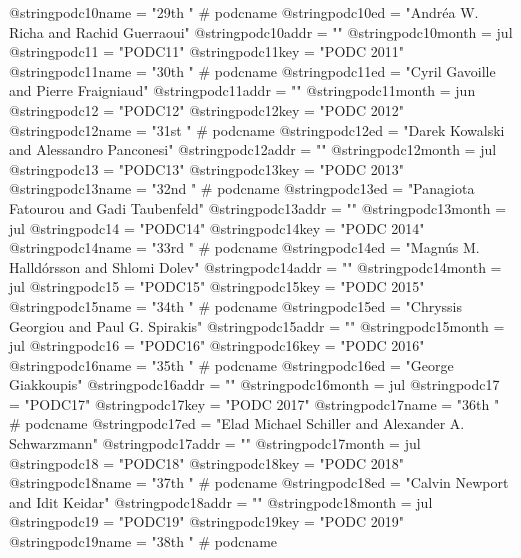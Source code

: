 @string{podc10name =            "29th " # podcname}
@string{podc10ed =              "Andr{\'e}a W. Richa and Rachid Guerraoui"}
@string{podc10addr =            ""}
@string{podc10month =           jul}
@string{podc11 =                "PODC11"}
@string{podc11key =             "PODC 2011"}
@string{podc11name =            "30th " # podcname}
@string{podc11ed =              "Cyril Gavoille and Pierre Fraigniaud"}
@string{podc11addr =            ""}
@string{podc11month =           jun}
@string{podc12 =                "PODC12"}
@string{podc12key =             "PODC 2012"}
@string{podc12name =            "31st " # podcname}
@string{podc12ed =              "Darek Kowalski and Alessandro Panconesi"}
@string{podc12addr =            ""}
@string{podc12month =           jul}
@string{podc13 =                "PODC13"}
@string{podc13key =             "PODC 2013"}
@string{podc13name =            "32nd " # podcname}
@string{podc13ed =              "Panagiota Fatourou and Gadi Taubenfeld"}
@string{podc13addr =            ""}
@string{podc13month =           jul}
@string{podc14 =                "PODC14"}
@string{podc14key =             "PODC 2014"}
@string{podc14name =            "33rd " # podcname}
@string{podc14ed =              "Magn{\'u}s M. Halld{\'o}rsson and Shlomi Dolev"}
@string{podc14addr =            ""}
@string{podc14month =           jul}
@string{podc15 =                "PODC15"}
@string{podc15key =             "PODC 2015"}
@string{podc15name =            "34th " # podcname}
@string{podc15ed =              "Chryssis Georgiou and Paul G. Spirakis"}
@string{podc15addr =            ""}
@string{podc15month =           jul}
@string{podc16 =                "PODC16"}
@string{podc16key =             "PODC 2016"}
@string{podc16name =            "35th " # podcname}
@string{podc16ed =              "George Giakkoupis"}
@string{podc16addr =            ""}
@string{podc16month =           jul}
@string{podc17 =                "PODC17"}
@string{podc17key =             "PODC 2017"}
@string{podc17name =            "36th " # podcname}
@string{podc17ed =              "Elad Michael Schiller and Alexander A. Schwarzmann"}
@string{podc17addr =            ""}
@string{podc17month =           jul}
@string{podc18 =                "PODC18"}
@string{podc18key =             "PODC 2018"}
@string{podc18name =            "37th " # podcname}
@string{podc18ed =              "Calvin Newport and Idit Keidar"}
@string{podc18addr =            ""}
@string{podc18month =           jul}
@string{podc19 =                "PODC19"}
@string{podc19key =             "PODC 2019"}
@string{podc19name =            "38th " # podcname}
